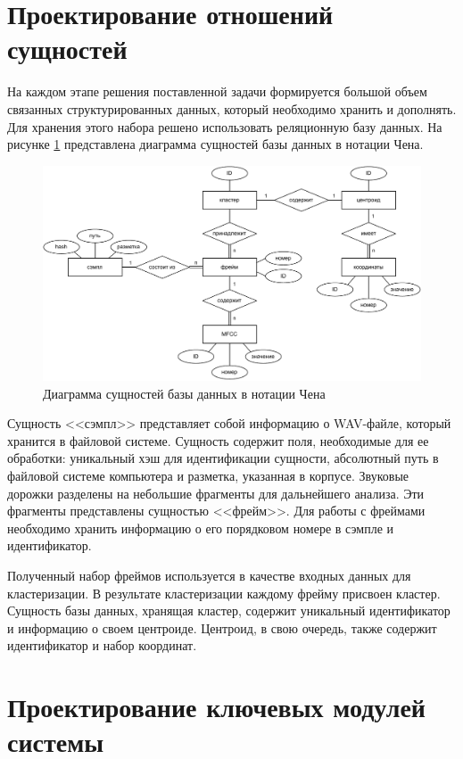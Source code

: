 \section{Проектирование отношений сущностей}
На каждом этапе  решения поставленной задачи формируется большой объем связанных структурированных данных, который необходимо хранить и дополнять. Для хранения этого набора решено использовать реляционную базу данных. На рисунке \ref{fig:chen} представлена диаграмма сущностей базы данных в нотации Чена.
\begin{figure}[H]
	\centering
	\includegraphics[width=\linewidth]{assets/chen}
	\caption{Диаграмма сущностей базы данных в нотации Чена}
	\label{fig:chen}
\end{figure} 
Сущность <<сэмпл>> представляет собой информацию о WAV-файле, который хранится в файловой системе. Сущность содержит поля, необходимые для ее обработки: уникальный хэш для идентификации сущности, абсолютный путь в файловой системе компьютера и разметка, указанная в корпусе. Звуковые дорожки разделены на небольшие фрагменты для дальнейшего анализа. Эти фрагменты представлены сущностью <<фрейм>>. Для работы с фреймами необходимо хранить информацию о его порядковом номере в сэмпле и идентификатор. 

Полученный набор фреймов используется в качестве входных данных для кластеризации. В результате кластеризации каждому фрейму присвоен кластер. Сущность базы данных, хранящая кластер, содержит уникальный идентификатор и информацию о своем центроиде. Центроид, в свою очередь, также содержит идентификатор и набор координат.

\section{Проектирование ключевых модулей системы}
